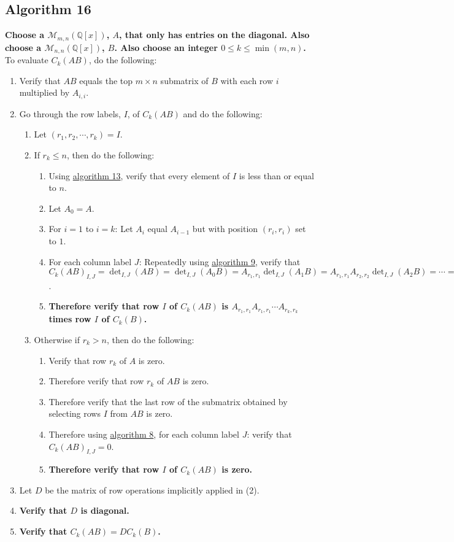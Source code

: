 \documentclass[twocolumn]{article}
\begin{document}
		\subsection{Algorithm 16}\label{sec:algorithm 16}
			\textbf{Choose a $\mathcal{M}_{m,n}(\mathbb{Q}[x])$, $A$, that only has entries on the diagonal. Also choose a $\mathcal{M}_{n,n}(\mathbb{Q}[x])$, $B$. Also choose an integer $0\le k\le\min(m,n)$.} To evaluate $C_k(AB)$, do the following:
			\begin{enumerate}
				\item Verify that $AB$ equals the top $m\times n$ submatrix of $B$ with each row $i$ multiplied by $A_{i,i}$.
				\item Go through the row labels, $I$, of $C_k(AB)$ and do the following:
				\begin{enumerate}
					\item Let $(r_1, r_2, \cdots, r_k)=I$.
					\item If $r_k\le n$, then do the following:
					\begin{enumerate}
						\item Using \hyperref[sec:algorithm 13]{algorithm 13}, verify that every element of $I$ is less than or equal to $n$.
						\item Let $A_0=A$.
						\item For $i=1$ to $i=k$: Let $A_i$ equal $A_{i-1}$ but with position $(r_i,r_i)$ set to $1$.
						\item For each column label $J$: Repeatedly using \hyperref[sec:algorithm 9]{algorithm 9}, verify that ${C_k(AB)}_{I,J}=\det_{I,J}(AB)=\det_{I,J}(A_0B)=A_{r_1,r_1}\det_{I,J}(A_1B)=A_{r_1,r_1}A_{r_2,r_2}\det_{I,J}(A_2B)=\cdots=A_{r_1,r_1}A_{r_2,r_2}\cdots A_{r_k,r_k}\det_{I,J}(A_kB)=A_{r_1,r_1}A_{r_2,r_2}\cdots A_{r_k,r_k}\det_{I,J}(B)=A_{r_1,r_1}A_{r_2,r_2}\cdots A_{r_k,r_k}{C_k(B)}_{I,J}$.
						\item \textbf{Therefore verify that row $I$ of $C_k(AB)$ is $A_{r_1,r_1}A_{r_1,r_1}\cdots A_{r_k,r_k}$ times row $I$ of $C_k(B)$.}
					\end{enumerate}
					\item Otherwise if $r_k>n$, then do the following:
					\begin{enumerate}
						\item Verify that row $r_k$ of $A$ is zero.
						\item Therefore verify that row $r_k$ of $AB$ is zero.
						\item Therefore verify that the last row of the submatrix obtained by selecting rows $I$ from $AB$ is zero.
						\item Therefore using \hyperref[sec:algorithm 8]{algorithm 8}, for each column label $J$: verify that ${C_k(AB)}_{I,J}=0$.
						\item \textbf{Therefore verify that row $I$ of $C_k(AB)$ is zero.}
					\end{enumerate}
				\end{enumerate}
				\item Let $D$ be the matrix of row operations implicitly applied in (2).
				\item \textbf{Verify that $D$ is diagonal.}
				\item \textbf{Verify that $C_k(AB)=DC_k(B)$.}
			\end{enumerate}
\end{document}
